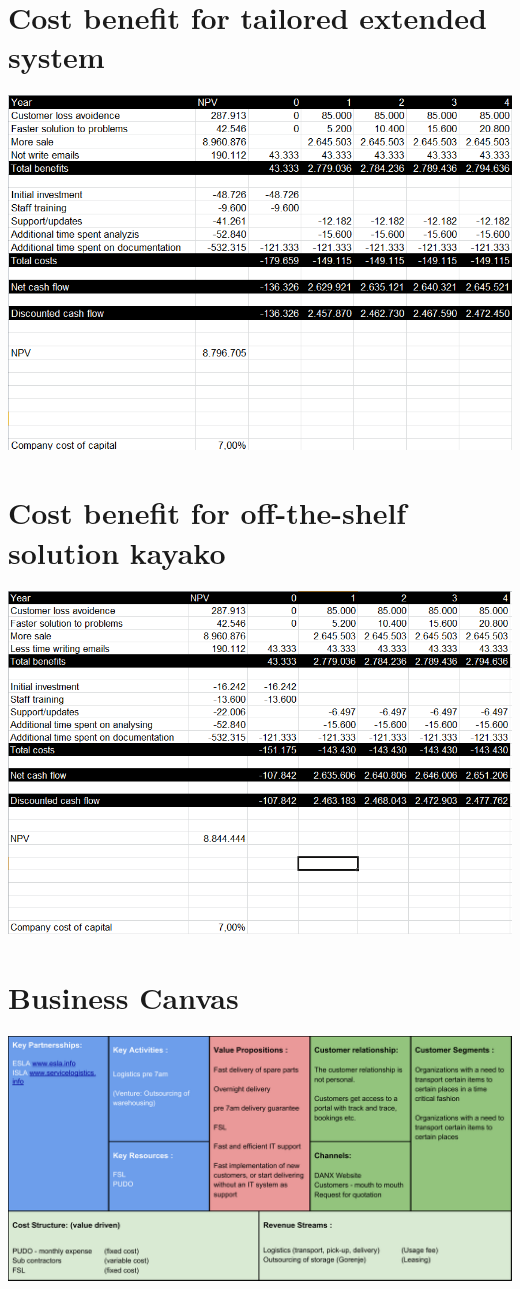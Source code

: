 \section{Cost benefit for tailored extended system}
\includegraphics[scale=0.72]{img/CostBenefit_TailoredExtended}


\section{Cost benefit for off-the-shelf solution kayako}
\includegraphics[scale=0.70]{img/CostBenefit_Off-the-shelf}

\section{Business Canvas}
\label{sec:business_canvas}
\includegraphics[angle=270, scale=0.85]{img/Business_Canvas.pdf}